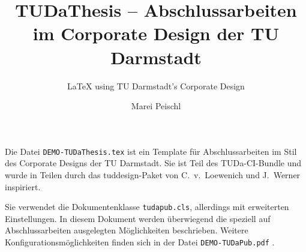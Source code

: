 \documentclass[
	german,%
	ruledheaders=section,%
	class=report,%
	thesis={type=bachelor},%
	accentcolor=9c,%
	custommargins=true,%
	marginpar=false,%
	parskip=half-,%
	fontsize=11pt,%
]{tudapub}
\let\file\texttt
\begin{document}
\title{TUDaThesis -- Abschlussarbeiten im Corporate Design der TU Darmstadt}
\subtitle{\LaTeX{} using TU Darmstadt's Corporate Design}
\author{Marei Peischl}


\submissiondate{\today}
\examdate{\today}


\maketitle

\tableofcontents


Die Datei \file{DEMO-TUDaThesis.tex} ist ein Template für Abschlussarbeiten im Stil des Corporate Designs der TU Darmstadt.
Sie ist Teil des TUDa-CI-Bundle und wurde in Teilen durch das tuddesign-Paket von C.~v.~Loewenich und J.~Werner inspiriert.




Sie verwendet die Dokumentenklasse \file{tudapub.cls}, allerdings mit erweiterten Einstellungen. In diesem Dokument werden überwiegend die speziell auf Abschlussarbeiten ausgelegten Möglichkeiten beschrieben. Weitere Konfigurationsmöglichkeiten finden sich in der Datei \file{DEMO-TUDaPub.pdf} \cite{tudapub}.
\end{document}
